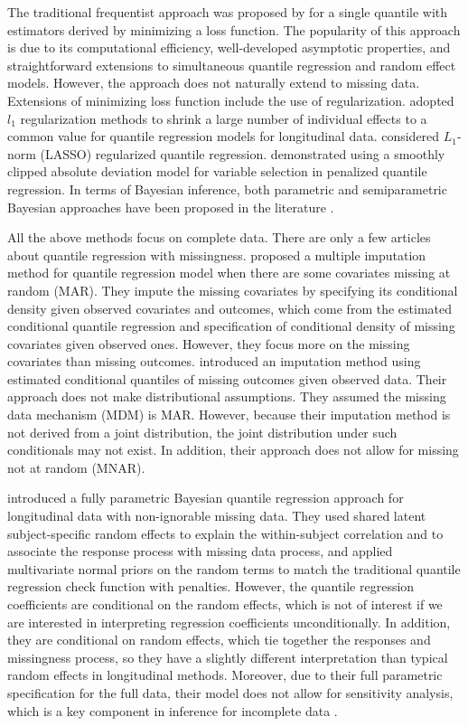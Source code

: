 \documentclass[useAMS,usenatbib,referee]{biom}
\begin{document}
The traditional frequentist approach was proposed by
\citet{koenker1978} for a single quantile with estimators derived by
minimizing a loss function. The popularity of this approach is due to
its computational efficiency, well-developed asymptotic properties,
and straightforward extensions to simultaneous quantile regression and
random effect models. However, the approach does not naturally
extend to missing data.
Extensions of minimizing loss function include the use of regularization.
\citet{koenker2004} adopted $l_1$ regularization methods to shrink a large number of individual effects to a common value for quantile regression models for longitudinal data.
\citet{li2008} considered $L_1$-norm (LASSO) regularized quantile regression.
\citet{wu2009} demonstrated using a smoothly clipped absolute deviation model for variable selection in penalized quantile regression.
In terms of Bayesian inference, both parametric and semiparametric Bayesian approaches have been proposed in the literature \citep{yu2001,walker1999,hanson2002,reich2010}.

All the above methods focus on complete data.  There are only a few
articles about quantile regression with missingness.  \citet{wei2012}
proposed a multiple imputation method for quantile regression model
when there are some covariates missing at random (MAR). They impute
the missing covariates by specifying its conditional density given
observed covariates and outcomes, which come from the estimated
conditional quantile regression and specification of conditional
density of missing covariates given observed ones.
However, they focus more on the missing covariates than missing outcomes.
\citet{bottai2013} introduced an imputation method using estimated
conditional quantiles of missing outcomes given observed data. Their
approach does not make distributional assumptions.  They assumed the
missing data mechanism (MDM) is MAR. However, because their
imputation method is not derived from a joint distribution, the joint
distribution under such conditionals may not exist.  In addition, their
approach does not allow for missing not at random (MNAR).

\citet{yuan2010} introduced a fully parametric Bayesian quantile
regression approach for longitudinal data with non-ignorable missing
data. They used shared latent subject-specific random effects to
explain the within-subject correlation and to associate the response
process with missing data process, and applied multivariate normal
priors on the random terms to match the traditional quantile
regression check function with penalties. However, the quantile
regression coefficients are conditional on the random effects, which
is not of interest if we are interested in interpreting regression
coefficients unconditionally.  In addition, they are
conditional on random effects, which tie together the responses and
missingness process, so they have a slightly different interpretation
than typical random effects in longitudinal methods. Moreover, due to
their full parametric specification for the full data, their model
does not allow for sensitivity analysis, which is a key component in
inference for incomplete data \citep{nas2010}.
\end{document}

